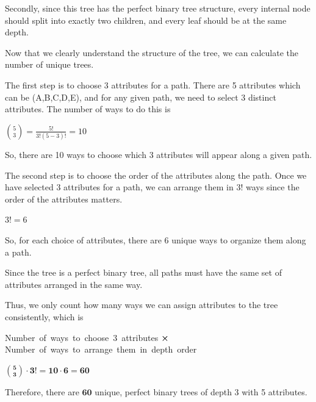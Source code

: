 \documentclass[12pt,letterpaper, onecolumn]{exam}
\begin{document}
\begin{questions}
\begin{parts}
\begin{solution}
        Secondly, since this tree has the perfect binary tree structure, every internal node should split into exactly two children,
        and every leaf should be at the same depth.

        Now that we clearly understand the structure of the tree, we can calculate the number of unique trees.

        The first step is to choose 3 attributes for a path. There are 5 attributes which can be (A,B,C,D,E),
        and for any given path, we need to select 3 distinct attributes. The number of ways to do this is

        \begin{center}
            $\displaystyle{\binom{5}{3} = \frac{5!}{3!(5-3)!} = 10}$
        \end{center}

        So, there are 10 ways to choose which 3 attributes will appear along a given path.

        The second step is to choose the order of the attributes along the path.
        Once we have selected 3 attributes for a path, we can arrange them in $3!$ ways
        since the order of the attributes matters.

        \begin{center}
            $\displaystyle{3! = 6}$
        \end{center}

        So, for each choice of attributes, there are $6$ unique ways to organize them along a path.

        Since the tree is a perfect binary tree, all paths must have the same set of attributes arranged in the same way.

        Thus, we only count how many ways we can assign attributes to the tree consistently, which is 

        \begin{center}
            Number of ways to choose 3 attributes $\displaystyle{\cross}$ Number of ways to arrange them in depth order

            $\boldsymbol{\displaystyle{\binom{5}{3} \cdot 3! = 10 \cdot 6 = 60}}$
        \end{center}

        Therefore, there are $\boldsymbol{60}$ unique, perfect binary trees of depth 3 with 5 attributes.

      \end{solution}

      \pagebreak
      

\end{parts}
\end{questions}
\end{document}
